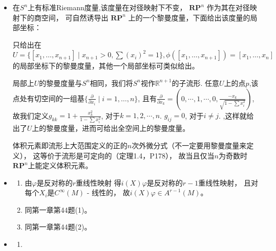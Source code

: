 \begin{itemize}

\item[2.] 
在$S^n$上有标准Riemann度量,该度量在对径映射下不变， 
$\mathbf{RP} ^n$ 作为其在对径映射下的商空间，
可自然诱导出 $\mathbf{RP} ^n$ 上的一个黎曼度量，下面给出该度量的局部坐标：

只给出在$U=\{[x_1,\dots,x_{n+1}]\mid x_{n+1}>0,\sum (x_i)^2=1\},\phi([x_1,\dots,x_{n+1}])=[x_1,\dots,x_n]$
的局部坐标下的黎曼度量，其他一个局部坐标可类似给出。

局部上$U$的黎曼度量与$S^n$相同，我们将$S^n$视作$\mathbb{R}^{n+1}$的子流形. 
任意$U$上的点$p$,该点处有切空间的一组基$\{\frac{\partial}{\partial x_i}\mid i=1,\dots,n\}$, 且有$\frac{\partial}{\partial x_k}=(0,\cdots,1,\cdots,0,\frac{-x_k}{\sqrt{1-\sum x_i^2}})$, 故我们定义$g_{kk}=1+\frac{x_k^2}{1-\sum x_i^2}$, 对于$k=1,2,\cdots,n$. $g_{ij}=0$, 对于$i\neq j$.
,这样就给出了$U$上的黎曼度量，进而可给出全空间上的黎曼度量。

体积元素即流形上大范围定义的正的$n$次外微分式（不一定要用黎曼度量来定义），
这等价于流形是可定向的（定理1.4，P178），
故当且仅当$n$为奇数时$\mathbf{RP}^n$上能定义体积元素。

\item[3.] 
    \begin{enumerate}
        \item[(1)]
        由$\varphi$是反对称的$r$重线性映射
        得$i(X)\varphi$是反对称的$r-1$重线性映射，
        且对每个$X_i$是$C^\infty(M)$ - 线性的，
        故$i(X)\varphi\in A^{r-1}(M)$。
    
        \item[(2)] 
        同第一章第44题(1)。
        \item[(3)] 
        同第一章第44题(2)。
    \end{enumerate}

\item[4.]
    \begin{enumerate}
        \item[(1)]
        


\end{enumerate}
\end{itemize}
